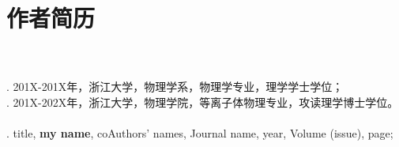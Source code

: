 \chapter*{作者简历}
\\[4pt]

\\[4pt]
\quad{}. 201X-201X年，浙江大学，物理学系，物理学专业，理学学士学位；\\[4pt]
\quad{}. 201X-202X年，浙江大学，物理学院，等离子体物理专业，攻读理学博士学位。\\[4pt]

\\[4pt]
\quad{}. {title}, \textbf{my name}, coAuthors' names, Journal name, year, Volume (issue), page;\\[4pt]
